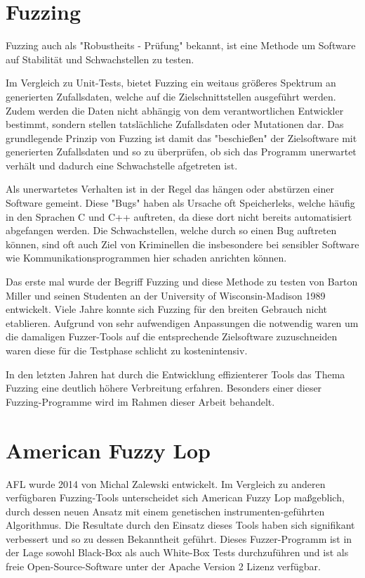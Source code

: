 \documentclass[12pt,a4paper]{scrreprt}
\begin{document}
\section{Fuzzing}
Fuzzing auch als "Robustheits - Prüfung" bekannt, ist eine Methode um Software auf Stabilität und Schwachstellen zu testen. 

Im Vergleich zu Unit-Tests, bietet Fuzzing ein weitaus größeres Spektrum an generierten Zufallsdaten, welche auf die Zielschnittstellen ausgeführt werden.
Zudem werden die Daten nicht abhängig von dem verantwortlichen Entwickler bestimmt, sondern stellen tatslächliche Zufallsdaten oder Mutationen dar. Das grundlegende Prinzip von Fuzzing ist damit das "beschießen" der Zielsoftware mit generierten Zufallsdaten und so zu überprüfen, ob sich das Programm unerwartet verhält und dadurch eine Schwachstelle afgetreten ist.

Als unerwartetes Verhalten ist in der Regel das hängen oder abstürzen einer Software gemeint. Diese "Bugs" haben als Ursache oft Speicherleks, welche häufig in den Sprachen C und C++ auftreten, da diese dort nicht bereits automatisiert abgefangen werden. Die Schwachstellen, welche durch so einen Bug auftreten können, sind oft auch Ziel von Kriminellen die insbesondere bei sensibler Software wie Kommunikationsprogrammen hier schaden anrichten können.

Das erste mal wurde der Begriff Fuzzing und diese Methode zu testen von Barton Miller und seinen Studenten an der University of Wisconsin-Madison 1989 entwickelt.
Viele Jahre konnte sich Fuzzing für den breiten Gebrauch nicht etablieren. Aufgrund von sehr aufwendigen Anpassungen die notwendig waren um die damaligen Fuzzer-Tools auf die entsprechende Zielsoftware zuzuschneiden waren diese für die Testphase schlicht zu kostenintensiv. 

In den letzten Jahren hat durch die Entwicklung effizienterer Tools das Thema Fuzzing eine deutlich höhere Verbreitung erfahren. Besonders einer dieser Fuzzing-Programme wird im Rahmen dieser Arbeit behandelt.   

\newpage

\section{American Fuzzy Lop}
AFL wurde 2014 von Michal Zalewski entwickelt. Im Vergleich zu anderen verfügbaren Fuzzing-Tools unterscheidet sich American Fuzzy Lop maßgeblich, durch dessen neuen Ansatz mit einem genetischen instrumenten-geführten Algorithmus. Die Resultate durch den Einsatz dieses Tools haben sich signifikant verbessert und so zu dessen Bekanntheit geführt. 
Dieses Fuzzer-Programm ist in der Lage sowohl Black-Box als auch White-Box Tests durchzuführen und ist als freie Open-Source-Software unter der Apache Version 2 Lizenz verfügbar. 
\end{document}
